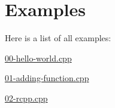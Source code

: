 \section{Examples}
Here is a list of all examples\+:\begin{DoxyCompactItemize}
\item 
\hyperlink{00-hello-world_8cpp-example}{00-\/hello-\/world.\+cpp}
\item 
\hyperlink{01-adding-function_8cpp-example}{01-\/adding-\/function.\+cpp}
\item 
\hyperlink{02-rcpp_8cpp-example}{02-\/rcpp.\+cpp}
\end{DoxyCompactItemize}
